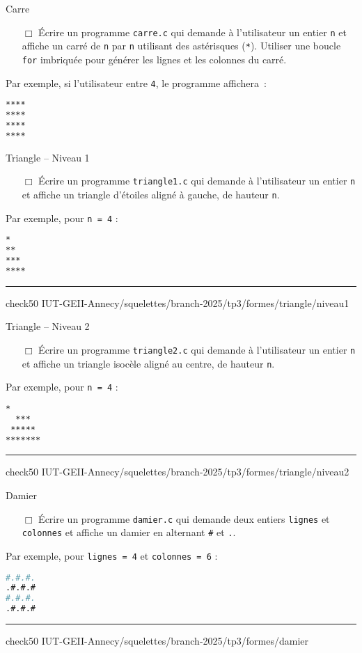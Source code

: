 \begin{UPSTIManipulation}{Carre}
	\begin{itemize}
		\item[$\Box$] Écrire un programme \texttt{carre.c} qui demande à l'utilisateur un entier \texttt{n} et affiche un carré de \texttt{n} par \texttt{n} utilisant des astérisques (\texttt{*}). Utiliser une boucle \texttt{for} imbriquée pour générer les lignes et les colonnes du carré.
	\end{itemize}
	Par exemple, si l'utilisateur entre \texttt{4}, le programme affichera :
	\begin{lstlisting}[language=bash,style=console]
****
****
****
****
\end{lstlisting}
\end{UPSTIManipulation}

\begin{UPSTIManipulation}{Triangle -- Niveau 1}
	\begin{itemize}
		\item[$\Box$] Écrire un programme \texttt{triangle1.c} qui demande à l’utilisateur un entier \texttt{n} et affiche un triangle d’étoiles aligné à gauche, de hauteur \texttt{n}.
	\end{itemize}
	Par exemple, pour \texttt{n = 4} :
	\begin{lstlisting}[language=bash,style=console]
*
**
***
****
\end{lstlisting}
	\hrule
	check50 IUT-GEII-Annecy/squelettes/branch-2025/tp3/formes/triangle/niveau1
\end{UPSTIManipulation}

\begin{UPSTIManipulation}{Triangle -- Niveau 2}
	\begin{itemize}
		\item[$\Box$] Écrire un programme \texttt{triangle2.c} qui demande à l’utilisateur un entier \texttt{n} et affiche un triangle isocèle aligné au centre, de hauteur \texttt{n}.
	\end{itemize}
	Par exemple, pour \texttt{n = 4} :
	\begin{lstlisting}[language=bash,style=console]
   *
  ***
 *****
*******    
\end{lstlisting}
	\hrule
	check50 IUT-GEII-Annecy/squelettes/branch-2025/tp3/formes/triangle/niveau2
\end{UPSTIManipulation}

\begin{UPSTIManipulation}{Damier}
	\begin{itemize}
		\item[$\Box$] Écrire un programme \texttt{damier.c} qui demande deux entiers \texttt{lignes} et \texttt{colonnes} et affiche un damier en alternant \texttt{\#} et \texttt{.}.
	\end{itemize}
	Par exemple, pour \texttt{lignes = 4} et \texttt{colonnes = 6} :
	\begin{lstlisting}[language=bash,style=console]
#.#.#.
.#.#.#
#.#.#.
.#.#.#
\end{lstlisting}
	\hrule
	check50 IUT-GEII-Annecy/squelettes/branch-2025/tp3/formes/damier
\end{UPSTIManipulation}

